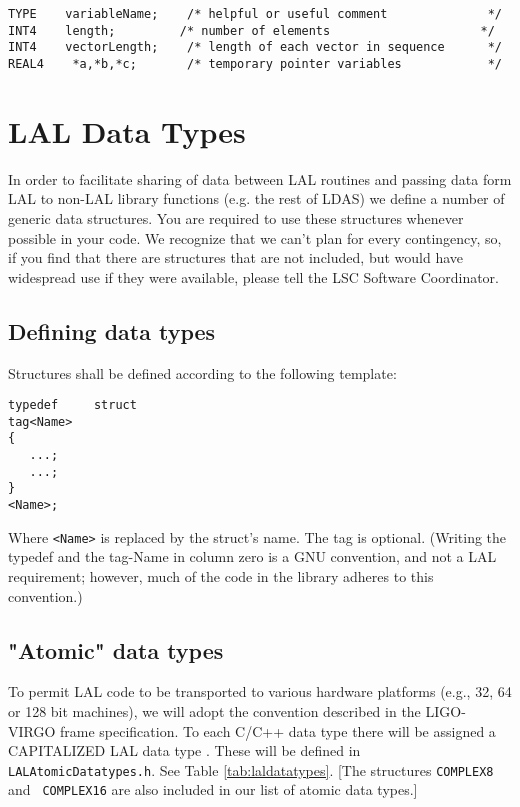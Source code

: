 \documentclass[]{ligodcc}
\begin{document}
{\footnotesize
\begin{verbatim}
TYPE    variableName;    /* helpful or useful comment              */
INT4    length;         /* number of elements                     */
INT4    vectorLength;    /* length of each vector in sequence      */
REAL4    *a,*b,*c;       /* temporary pointer variables            */
\end{verbatim}}

\section{LAL Data Types}
\label{sec:laldatatypes}

In order to facilitate sharing of data between LAL routines and
passing data form LAL to non-LAL library functions (e.g. the rest of
LDAS) we define a number of generic data structures. You are required
to use these structures whenever possible in your code.  We recognize
that we can't plan for every contingency, so, if you find that there
are structures that are not included, but would have widespread use if
they were available, please tell the LSC Software Coordinator.

\subsection{Defining data types}
Structures shall be defined according to the following template:
\begin{verbatim}
typedef 	struct 		
tag<Name> 
{
   ...; 
   ...;
}
<Name>;
\end{verbatim}

Where {\tt <Name>} is replaced by the struct's name. The tag is
optional.  (Writing the typedef  and the tag-Name in column zero is a
GNU convention, and not a LAL requirement; however, much of the code
in the library adheres to this convention.)

\subsection{"Atomic" data types}
\label{atomic}

To permit LAL code to be transported to various hardware platforms
(e.g., 32, 64 or 128 bit machines), we will adopt the convention
described in the LIGO-VIRGO frame specification. To each C/C++ data
type there will be assigned a CAPITALIZED LAL data type . These
will be defined in {\tt LALAtomicDatatypes.h}.  See  Table
\ref{tab:laldatatypes}.  [The structures {\tt COMPLEX8} and {\tt
COMPLEX16} are also included in our list of atomic data types.]
\end{document}
